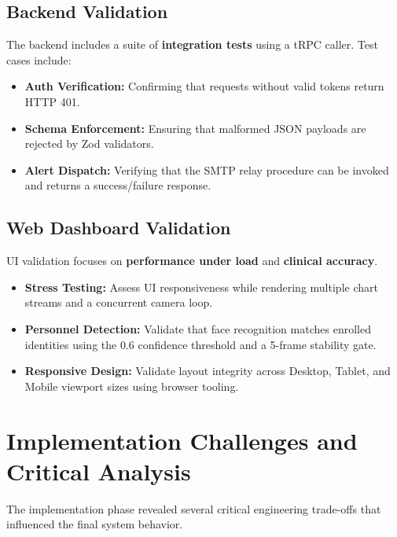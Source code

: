 \subsection{Backend Validation}
The backend includes a suite of \textbf{integration tests} using a tRPC caller. Test cases include:
\begin{itemize}
    \item \textbf{Auth Verification:} Confirming that requests without valid tokens return HTTP 401.
    \item \textbf{Schema Enforcement:} Ensuring that malformed JSON payloads are rejected by Zod validators.
	\item \textbf{Alert Dispatch:} Verifying that the SMTP relay procedure can be invoked and returns a success/failure response.
\end{itemize}

\subsection{Web Dashboard Validation}
UI validation focuses on \textbf{performance under load} and \textbf{clinical accuracy}.
\begin{itemize}
	\item \textbf{Stress Testing:} Assess UI responsiveness while rendering multiple chart streams and a concurrent camera loop.
	\item \textbf{Personnel Detection:} Validate that face recognition matches enrolled identities using the 0.6 confidence threshold and a 5-frame stability gate.
	\item \textbf{Responsive Design:} Validate layout integrity across Desktop, Tablet, and Mobile viewport sizes using browser tooling.
\end{itemize}

\section{Implementation Challenges and Critical Analysis}
The implementation phase revealed several critical engineering trade-offs that influenced the final system behavior.

